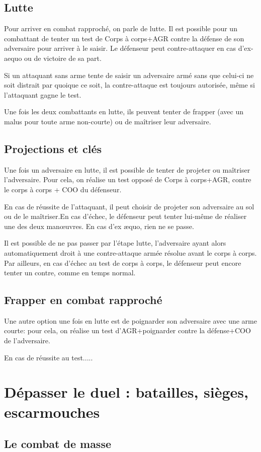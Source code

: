 \documentclass[10pt,a4paper,twocolumn]{book}
\begin{document}
\subsection{Lutte}
Pour arriver en combat rapproché, on parle de lutte. Il est possible pour un combattant de tenter un test de Corps à corps+AGR contre la défense de son adversaire pour arriver à le saisir. Le défenseur peut contre-attaquer en cas d'ex-aequo ou de victoire de sa part. 

Si un attaquant sans arme tente de saisir un adversaire armé sans que celui-ci ne soit distrait par quoique ce soit, la contre-attaque est toujours autorisée, même si l'attaquant gagne le test.

Une fois les deux combattants en lutte, ils peuvent tenter de frapper (avec un malus pour toute arme non-courte) ou de maîtriser leur adversaire.
\subsection{Projections et clés}
Une fois un adversaire en lutte, il est possible de tenter de projeter ou maîtriser l'adversaire. Pour cela, on réalise un test opposé de Corps à corps+AGR, contre le corps à corps + COO du défenseur.

En cas de réussite de l'attaquant, il peut choisir de projeter son adversaire au sol ou de le maîtriser.En cas d'échec, le défenseur peut tenter lui-même de réaliser une des deux manœuvres. En cas d'ex æquo, rien ne se passe.

Il est possible de ne pas passer par l'étape lutte, l'adversaire ayant alors automatiquement droit à une contre-attaque armée résolue avant le corps à corps. Par ailleurs, en cas d'échec au test de corps à corps, le défenseur peut encore tenter un contre, comme en temps normal.
\subsection{Frapper en combat rapproché}
Une autre option une fois en lutte est de poignarder son adversaire avec une arme courte: pour cela, on réalise un test d'AGR+poignarder contre la défense+COO de l'adversaire.

En cas de réussite au test.....
\section{Dépasser le duel : batailles, sièges, escarmouches}
\subsection{Le combat de masse}
\end{document}
